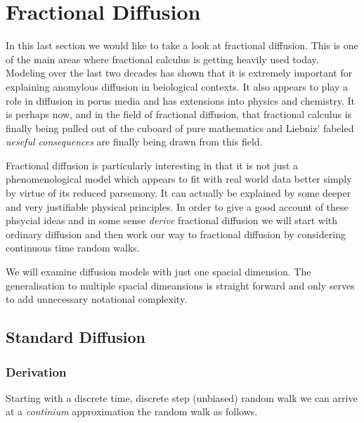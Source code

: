 \section{Fractional Diffusion}
In this last section we would like to take a look at fractional diffusion. This is one of the main areas where fractional calculus is getting heavily used today. Modeling over the last two decades has shown that it is extremely important for explaining anomylous diffusion in beiological contexts. It also appears to play a role in diffusion in porus media and has extensions into physics and chemistry. It is perhaps now, and in the field of fractional diffusion, that fractional calculus is finally being pulled out of the cuboard of pure mathematics and Liebniz' fabeled \emph{ueseful consequences} are finally being drawn from this field.

Fractional diffusion is particularly interesting in that it is not just a phenomenological model which appears to fit with real world data better simply by virtue of its reduced parsemony. It can actually be explained by some deeper and very justifiable physical principles. In order to give a good account of these phsycial ideas and in some sense \emph{derive} fractional diffusion we will start with ordinary diffusion and then work our way to fractional diffusion by considering continuous time random walks.

We will examine diffusion models with just one spacial dimension. The generalisation to multiple spacial dimeansions is straight forward and only serves to add unnecessary notational complexity.

\subsection{Standard Diffusion}
\subsubsection{Derivation}
Starting with a discrete time, discrete step (unbiased) random walk we can arrive at a \emph{continium} approximation the random walk as follows. 


